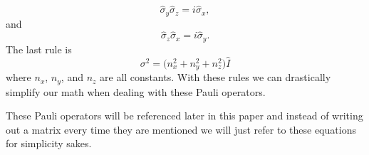 \documentclass[twocolumn]{article}
\begin{document}
\begin{equation}\label{eq:20}
\hat{\sigma}_y\hat{\sigma}_z=i\hat{\sigma}_x,
\end{equation}
and
\begin{equation}\label{eq:21}
\hat{\sigma}_z\hat{\sigma}_x=i\hat{\sigma}_y.
\end{equation}
The last rule is
\begin{equation}\label{eq:22}
\sigma^2=\big(n_x^2+n_y^2+n_z^2\big)\hat{I}
\end{equation}
where $n_x$, $n_y$, and $n_z$ are all constants. With these rules we can drastically simplify our math when dealing with these Pauli operators.

These Pauli operators will be referenced later in this paper and instead of writing out a matrix every time they are mentioned we will just refer to these equations for simplicity sakes.
\end{document}
